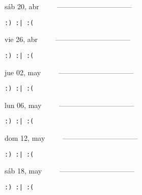 \documentclass[letterpaper,10pt]{article}
\begin{document}
\begin{multicols}{3}
{sáb 20, abr\ \ \ \ \ --------------------------------}
\begin{flushright}\begin{small}\texttt{:) :| :(}\end{small}\end{flushright}
\vfill
{vie 26, abr\ \ \ \ \ --------------------------------}
\begin{flushright}\begin{small}\texttt{:) :| :(}\end{small}\end{flushright}\par
\vfill
{jue 02, may\ \ \ \ \ --------------------------------}
\begin{flushright}\begin{small}\texttt{:) :| :(}\end{small}\end{flushright}\par
\vfill
\end{multicols}
\vspace{1.05cm}

\begin{multicols}{3}
{lun 06, may\ \ \ \ \ --------------------------------}
\begin{flushright}\begin{small}\texttt{:) :| :(}\end{small}\end{flushright}
\vfill
{dom 12, may\ \ \ \ \ --------------------------------}
\begin{flushright}\begin{small}\texttt{:) :| :(}\end{small}\end{flushright}\par
\vfill
{sáb 18, may\ \ \ \ \ --------------------------------}
\begin{flushright}\begin{small}\texttt{:) :| :(}\end{small}\end{flushright}\par
\vfill
\end{multicols}
\vspace{1.05cm}
\end{document}
